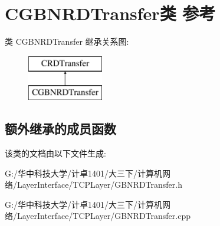 \hypertarget{class_c_g_b_n_r_d_transfer}{}\section{C\+G\+B\+N\+R\+D\+Transfer类 参考}
\label{class_c_g_b_n_r_d_transfer}
类 C\+G\+B\+N\+R\+D\+Transfer 继承关系图\+:\begin{figure}[H]
\begin{center}
\leavevmode
\includegraphics[height=2.000000cm]{class_c_g_b_n_r_d_transfer}
\end{center}
\end{figure}
\subsection*{额外继承的成员函数}


该类的文档由以下文件生成\+:\begin{DoxyCompactItemize}
\item 
G\+:/华中科技大学/计卓1401/大三下/计算机网络/\+Layer\+Interface/\+T\+C\+P\+Layer/G\+B\+N\+R\+D\+Transfer.\+h\item 
G\+:/华中科技大学/计卓1401/大三下/计算机网络/\+Layer\+Interface/\+T\+C\+P\+Layer/G\+B\+N\+R\+D\+Transfer.\+cpp\end{DoxyCompactItemize}

